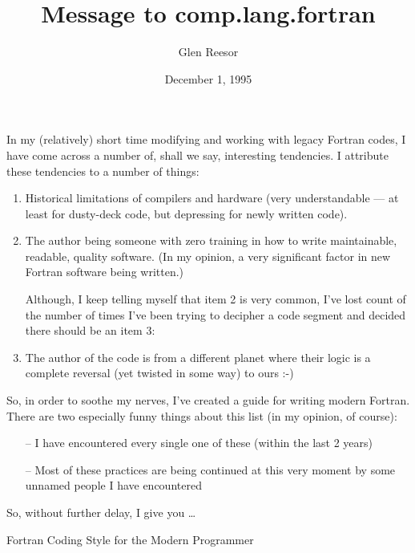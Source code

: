 \documentclass[12pt,letterpaper]{article}
\title{Message to comp.lang.fortran}
\author{Glen Reesor}
\date{December 1, 1995}
\begin{document}
\maketitle

\noindent In my (relatively) short time modifying and working with
legacy Fortran codes, I have come across a number of, shall we say,
interesting tendencies.  I attribute these tendencies to a number of
things:

\begin{enumerate}
\item Historical limitations of compilers and hardware (very
  understandable --- at least for dusty-deck code, but depressing
  for newly written code).

\item The author being someone with zero training in how to write 
  maintainable, readable, quality software.  (In my opinion, a very
  significant factor in new Fortran software being written.)

  Although, I keep telling myself that item 2 is very common, I've
  lost count of the number of times I've been trying to decipher
  a code segment and decided there should be an item 3:

\item The author of the code is from a different planet where their logic
  is a complete reversal (yet twisted in some way) to ours :-)
\end{enumerate}
So, in order to soothe my nerves, I've created a guide for writing
modern Fortran.  There are two especially funny things about this list
(in my opinion, of course):

\begin{itemize}
\item[--] I have encountered every single one of these (within the last 2 years)
\item[--] Most of these practices are being continued at this very moment by
  some unnamed people I have encountered
\end{itemize}

\noindent So, without further delay, I give you \ldots
\bigbreak
\begin{center}
\large Fortran Coding Style for the Modern Programmer
\end{center}
\end{document}
